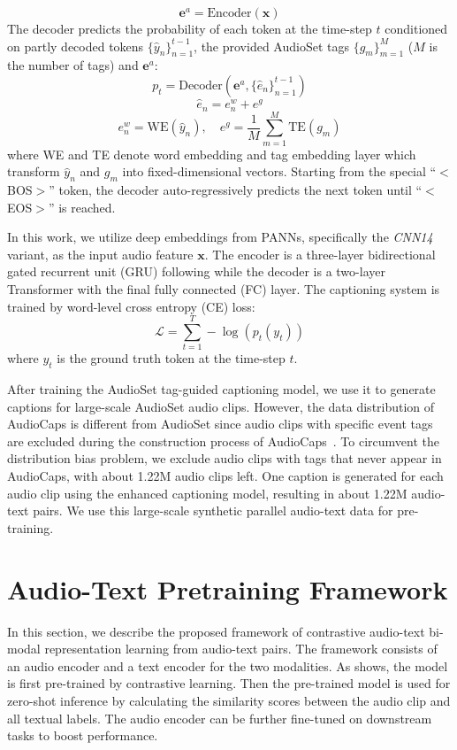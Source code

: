 \documentclass[sigconf,anonymous,review]{acmart}
\begin{document}
$$
    \mathbf{e}^{a} = \text{Encoder}(\mathbf{x})
$$
The decoder predicts the probability of each token at the time-step $t$ conditioned on partly decoded tokens $\{\hat{y}_n\}_{n=1}^{t-1}$, the provided AudioSet tags $\{{g}_m\}_{m=1}^{M}$ ($M$ is the number of tags) and $\mathbf{e}^{a}$:
$$
    p_t = \text{Decoder}(\mathbf{e}^{a}, \{\hat{e}_n\}_{n=1}^{t-1})
$$
$$
    \hat{e}_n = {e}_{n}^{w} + {e}^{g}
$$
$$
    {e}_{n}^{w}=\text{WE}(\hat{y}_n),
    \quad {e}^{g} = \frac{1}{M} \sum_{m=1}^{M}{\text{TE}(g_m)}
$$
where WE and TE denote word embedding and tag embedding layer which transform $\hat{y}_n$ and ${g}_m$ into fixed-dimensional vectors.
Starting from the special ``$<$BOS$>$'' token, the decoder auto-regressively predicts the next token until ``$<$EOS$>$'' is reached.

In this work, we utilize deep embeddings from PANNs, specifically the \textit{CNN14} variant, as the input audio feature $\mathbf{x}$.
The encoder is a three-layer bidirectional gated recurrent unit (GRU) following \cite{eren2020semantic} while the decoder is a two-layer Transformer with the final fully connected (FC) layer.
The captioning system is trained by word-level cross entropy (CE) loss:
$$
    \mathcal{L} = \sum_{t=1}^T-\log\left(p_t(y_t)\right)
$$
where $y_t$ is the ground truth token at the time-step $t$.

After training the AudioSet tag-guided captioning model, we use it to generate captions for large-scale AudioSet audio clips.
However, the data distribution of AudioCaps is different from AudioSet since audio clips with specific event tags are excluded during the construction process of AudioCaps~\cite{kim2019audiocaps}.
To circumvent the distribution bias problem, we exclude audio clips with tags that never appear in AudioCaps, with about 1.22M audio clips left.
One caption is generated for each audio clip using the enhanced captioning model, resulting in about 1.22M audio-text pairs.
We use this large-scale synthetic parallel audio-text data for pre-training.

\section{Audio-Text Pretraining Framework}

In this section, we describe the proposed framework of contrastive audio-text bi-modal representation learning from audio-text pairs.
The framework consists of an audio encoder and a text encoder for the two modalities.
As  shows, the model is first pre-trained by contrastive learning.
Then the pre-trained model is used for zero-shot inference by calculating the similarity scores between the audio clip and all textual labels.
The audio encoder can be further fine-tuned on downstream tasks to boost performance.
\end{document}
